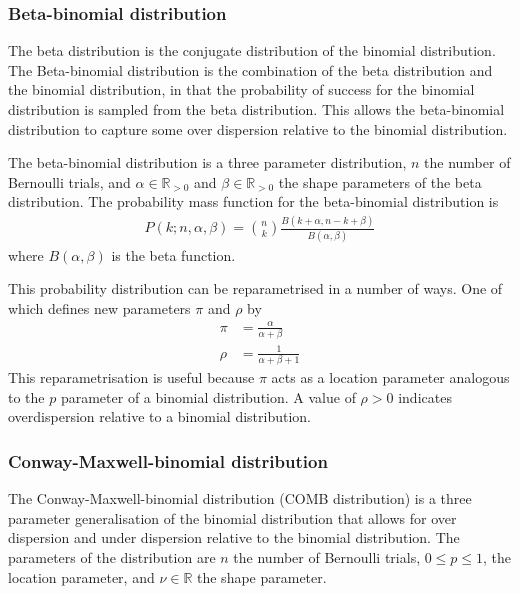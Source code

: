 \documentclass[a4paper,12pt]{article}
\theoremstyle{definition}
\begin{document}
      \subsubsection{Beta-binomial distribution}
      The beta distribution is the conjugate distribution of the binomial distribution. The Beta-binomial distribution is the combination of the beta distribution and the binomial distribution, in that the probability of success for the binomial distribution is sampled from the beta distribution. This allows the beta-binomial distribution to capture some over dispersion relative to the binomial distribution.

      The beta-binomial distribution is a three parameter distribution, $n$ the number of Bernoulli trials, and $\alpha \in \mathbb{R}_{>0}$ and $\beta \in \mathbb{R}_{>0}$ the shape parameters of the beta distribution. The probability mass function for the beta-binomial distribution is
      \begin{align}\label{eq:betabinomial_pdf}
        P(k;n, \alpha, \beta) = \binom{n}{k}\frac{B(k + \alpha, n - k + \beta)}{B(\alpha, \beta)}
      \end{align}
      where $B(\alpha, \beta)$ is the beta function.

      This probability distribution can be reparametrised in a number of ways. One of which defines new parameters $\pi$ and $\rho$ by
      \begin{align}\label{eq:betabinomial_reparam}
        \pi &= \frac{\alpha}{\alpha + \beta} \\
        \rho &= \frac{1}{\alpha + \beta + 1}
      \end{align}
      This reparametrisation is useful because $\pi$ acts as a location parameter analogous to the $p$ parameter of a binomial distribution. A value of $\rho > 0$ indicates overdispersion relative to a binomial distribution.

      \subsubsection{Conway-Maxwell-binomial distribution}
      The Conway-Maxwell-binomial distribution (COMB distribution) is a three parameter generalisation of the binomial distribution that allows for over dispersion and under dispersion relative to the binomial distribution. The parameters of the distribution are $n$ the number of Bernoulli trials, $0 \leq p \leq 1$, the location parameter, and $\nu \in \mathbb{R}$ the shape parameter.  
\end{document}
